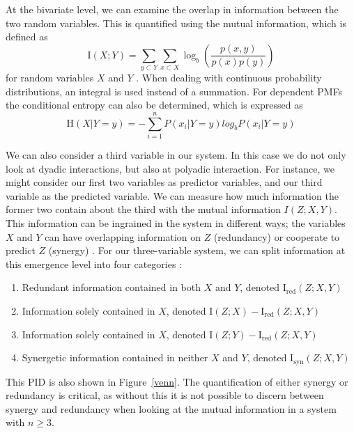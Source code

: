 \documentclass[../main.tex]{subfiles}
\begin{document}
At the bivariate level, we can examine the overlap in information between the two random variables.
This is quantified using the mutual information, which is defined as 
%
\begin{equation}
\label{MI}
\mathrm{I}(X;Y) = \sum_{y \subset Y} \sum_{x \subset X} \log_b (\frac{p(x,y)}{p(x) p(y)})
\end{equation}
%
for random variables $X$ and $Y$ \cite{cover2012elements}.
When dealing with continuous probability distributions, an integral is used instead of a summation.
For dependent PMFs the conditional entropy can also be determined, which is expressed as 
%
\begin{equation}
\mathrm{H}(X | Y = y) = -\sum^n_{i=1} P(x_i | Y = y) log_b P(x_i | Y = y)
\end{equation}
%

We can also consider a third variable in our system.
In this case we do not only look at dyadic interactions, but also at polyadic interaction.
For instance, we might consider our first two variables as predictor variables, and our third variable as the predicted variable.
We can measure how much information the former two contain about the third with the mutual information $I(Z;X,Y)$.
This information can be ingrained in the system in different ways; the variables $X$ and $Y$ can have overlapping information on $Z$ (redundancy) or cooperate to predict $Z$ (synergy) \cite{griffith2014quantifying}.
For our three-variable system, we can split information at this emergence level into four categories \cite{williams2010nonnegative}: %
%
\begin{enumerate}
\item Redundant information contained in both $X$ and $Y$, denoted $\mathrm{I}_\mathrm{red}(Z;X,Y)$
\item Information solely contained in $X$, denoted $\mathrm{I}(Z; X) - \mathrm{I}_\mathrm{red}(Z;X,Y)$
\item Information solely contained in $X$, denoted $\mathrm{I}(Z; Y) - \mathrm{I}_\mathrm{red}(Z;X,Y)$
\item Synergetic information contained in neither $X$ and $Y$, denoted $\mathrm{I}_\mathrm{syn}(Z;X,Y)$
\end{enumerate}
This PID is also shown in Figure~\ref{venn}.
The quantification of either synergy or redundancy is critical, as without this it is not possible to discern between synergy and redundancy when looking at the mutual information in a system with $n \ge 3$.
\end{document}

